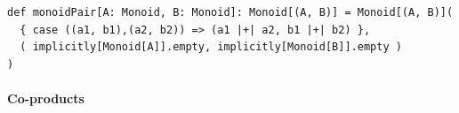 \begin{lstlisting}
def monoidPair[A: Monoid, B: Monoid]: Monoid[(A, B)] = Monoid[(A, B)](
  { case ((a1, b1),(a2, b2)) => (a1 |+| a2, b1 |+| b2) },
  ( implicitly[Monoid[A]].empty, implicitly[Monoid[B]].empty )
)
\end{lstlisting}

\paragraph{Co-products}

